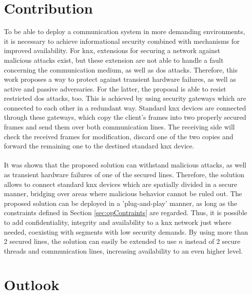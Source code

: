 \section{Contribution}
To be able to deploy a communication system in more demanding environments, it is necessary to achieve informational security combined with mechanisms for improved availability.
For \gls{knx}, extensions for securing a network against malicious attacks exist, but these extension are not able to handle a fault concerning the communication medium, as well
as \gls{dos} attacks.
Therefore, this work proposes a way to protect against transient hardware failures, as well as active and passive adversaries. For the latter, the proposal is able to resist
restricted \gls{dos} attacks, too. This is achieved by using security gateways which are connected to each other in a redundant way. Standard \gls{knx} devices are connected 
through these gateways, which copy the client's frames into two properly secured frames and send them over both communication lines. The receiving side will check the received
frames for modification, discard one of the two copies and forward the remaining one to the destined standard \gls{knx} device.
\\
\\
It was shown that the proposed solution can withstand malicious attacks, as well as transient hardware failures of one of the secured lines. Therefore, the solution allows to connect
standard \gls{knx} devices which are spatially divided in a secure manner, bridging over areas where malicious behavior cannot be ruled out.
The proposed solution can be deployed in a 'plug-and-play' 
manner, as long as the constraints defined in Section \ref{sec:opContraints} are regarded. Thus, it is possible to add confidentiality, integrity and availability to a \gls{knx}
network just where needed, coexisting with segments with low security demands. By using more than 2 secured lines, the solution can easily be extended to use $n$ instead of 2 secure threads
and communication lines, increasing availability to an even higher level.

\section{Outlook}

